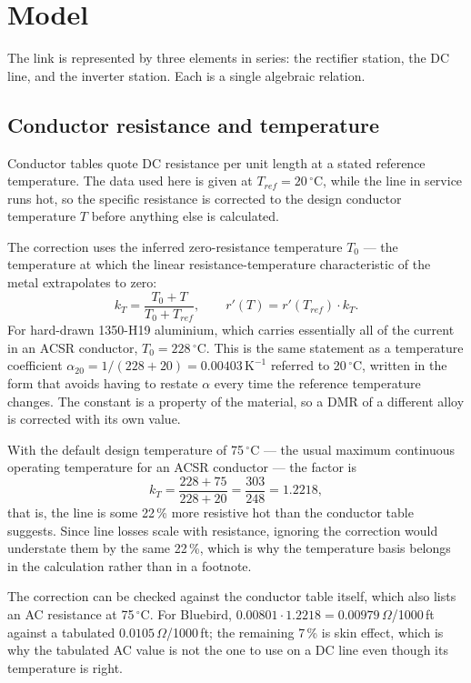 \section{Model}
\label{sec:model}

The link is represented by three elements in series: the rectifier station, the
DC line, and the inverter station. Each is a single algebraic relation.

\subsection{Conductor resistance and temperature}
Conductor tables quote DC resistance per unit length at a stated reference
temperature. The data used here is given at $T_{ref} = 20\,^{\circ}$C, while
the line in service runs hot, so the specific resistance is corrected to the
design conductor temperature $T$ before anything else is calculated.

The correction uses the inferred zero-resistance temperature $T_{0}$ --- the
temperature at which the linear resistance-temperature characteristic of the
metal extrapolates to zero:
\begin{equation}
  k_{T} = \frac{T_{0}+T}{T_{0}+T_{ref}},
  \qquad
  r'(T) = r'(T_{ref})\cdot k_{T} .
  \label{eq:ktemp}
\end{equation}
For hard-drawn 1350-H19 aluminium, which carries essentially all of the
current in an ACSR conductor, $T_{0} = 228\,^{\circ}$C. This is the same
statement as a temperature coefficient
$\alpha_{20} = 1/(228+20) = 0.00403\,\mathrm{K}^{-1}$ referred to
20\,$^{\circ}$C, written in the form that avoids having to restate $\alpha$
every time the reference temperature changes. The constant is a
property of the material, so a DMR of a different alloy is corrected with its
own value.

With the default design temperature of 75\,$^{\circ}$C --- the usual maximum
continuous operating temperature for an ACSR conductor --- the factor is
\begin{equation}
  k_{T} = \frac{228+75}{228+20} = \frac{303}{248} = 1.2218,
  \label{eq:ktvalue}
\end{equation}
that is, the line is some 22\,\% more resistive hot than the conductor table
suggests. Since line losses scale with resistance, ignoring the correction
would understate them by the same 22\,\%, which is why the temperature basis
belongs in the calculation rather than in a footnote.

The correction can be checked against the conductor table itself, which also
lists an AC resistance at 75\,$^{\circ}$C. For Bluebird,
$0.00801\cdot 1.2218 = 0.00979\,\Omega$/1000\,ft against a tabulated
$0.0105\,\Omega$/1000\,ft; the remaining 7\,\% is skin effect, which is why
the tabulated AC value is not the one to use on a DC line even though its
temperature is right.


